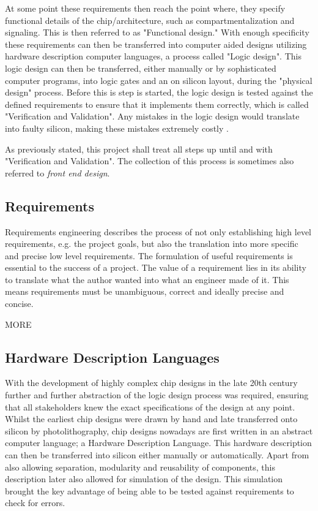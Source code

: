 At some point these requirements then reach the point where, they specify functional details of the chip/architecture, such as compartmentalization and signaling. This is then referred to as "Functional design." With enough specificity these requirements can then be transferred into computer aided designs utilizing hardware description computer languages, a process called "Logic design". This logic design can then be transferred, either manually or by sophisticated computer programs, into logic gates and an on silicon layout, during the "physical design"  process. Before this is step is started, the logic design is tested against the defined requirements to ensure that it implements them correctly, which is called "Verification and Validation". Any mistakes in the logic design would translate into faulty silicon, making these mistakes extremely costly \cite{chipdesignflow1} \cite{chipdesignflow2}.

As previously stated, this project shall treat all steps up until and with "Verification and Validation". The collection of this process is sometimes also referred to \textit{front end design}.

\subsection{Requirements}
Requirements engineering describes the process of not only establishing high level requirements, e.g. the project goals, but also the translation into more specific and precise low level requirements. The formulation of useful requirements is essential to the success of a project. The value of a requirement lies in its ability to translate what the author wanted into what an engineer made of it. This means requirements must be unambiguous, correct and ideally precise and concise. \cite{cite.needed}

MORE

\subsection{Hardware Description Languages}
With the development of highly complex chip designs in the late 20th century further and further abstraction of the logic design process was required, ensuring that all stakeholders knew the exact specifications of the design at any point. \cite{1214355} Whilst the earliest chip designs were drawn by hand and late transferred onto silicon by photolithography, chip designs nowadays are first written in an abstract computer language; a Hardware Description Language. This hardware description can then be transferred into silicon either manually or automatically.  Apart from also allowing separation, modularity and reusability of components, this description later also allowed for simulation of the design. This simulation brought the key advantage of being able to be tested against requirements to check for errors.

